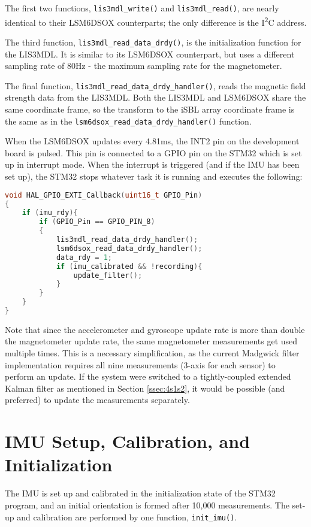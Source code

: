 \documentclass[12pt,a4paper]{report}
\begin{document}
The first two functions, \verb|lis3mdl_write()| and \verb|lis3mdl_read()|, are nearly identical to their LSM6DSOX counterparts; the only difference is the I\textsuperscript{2}C address.

The third function, \verb|lis3mdl_read_data_drdy()|, is the initialization function for the LIS3MDL. It is similar to its LSM6DSOX counterpart, but uses a different sampling rate of 80Hz - the maximum sampling rate for the magnetometer. 

The final function, \verb|lis3mdl_read_data_drdy_handler()|, reads the magnetic field strength data from the LIS3MDL. Both the LIS3MDL and LSM6DSOX share the same coordinate frame, so the transform to the iSBL array coordinate frame is the same as in the \verb|lsm6dsox_read_data_drdy_handler()| function.

When the LSM6DSOX updates every 4.81ms, the INT2 pin on the development board is pulsed. This pin is connected to a GPIO pin on the STM32 which is set up in interrupt mode. When the interrupt is triggered (and if the IMU has been set up), the STM32 stops whatever task it is running and executes the following:

\begin{lstlisting}[language=C++]
void HAL_GPIO_EXTI_Callback(uint16_t GPIO_Pin)
{
	if (imu_rdy){
		if (GPIO_Pin == GPIO_PIN_8)
		{
			lis3mdl_read_data_drdy_handler();
			lsm6dsox_read_data_drdy_handler();
			data_rdy = 1;
			if (imu_calibrated && !recording){
				update_filter();
			}
		}
	}
}
\end{lstlisting}

Note that since the accelerometer and gyroscope update rate is more than double the magnetometer update rate, the same magnetometer measurements get used multiple times. This is a necessary simplification, as the current Madgwick filter implementation requires all nine measurements (3-axis for each sensor) to perform an update. If the system were switched to a tightly-coupled extended Kalman filter as mentioned in Section \ref{ssec:4s1s2}, it would be possible (and preferred) to update the measurements separately.

\section{IMU Setup, Calibration, and Initialization} \label{sec:4s3}
The IMU is set up and calibrated in the initialization state of the STM32 program, and an initial orientation is formed after 10,000 measurements. The set-up and calibration are performed by one function, \verb|init_imu()|.
\end{document}
